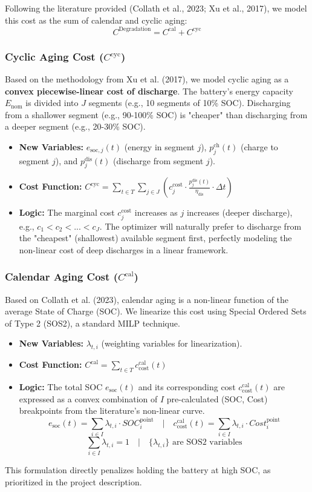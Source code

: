 \documentclass[11pt, a4paper]{article}
\begin{document}
Following the literature provided (Collath et al., 2023; Xu et al., 2017), we model this cost as the sum of calendar and cyclic aging:
$$ C^{\mathrm{Degradation}} = C^{\mathrm{cal}} + C^{\mathrm{cyc}} $$

\subsubsection{Cyclic Aging Cost ($C^{\mathrm{cyc}}$)}
Based on the methodology from Xu et al. (2017), we model cyclic aging as a \textbf{convex piecewise-linear cost of discharge}. The battery's energy capacity $E_{\mathrm{nom}}$ is divided into $J$ segments (e.g., 10 segments of 10\% SOC). Discharging from a shallower segment (e.g., 90-100\% SOC) is "cheaper" than discharging from a deeper segment (e.g., 20-30\% SOC).
\begin{itemize}
    \item \textbf{New Variables:} $e_{\mathrm{soc},j}(t)$ (energy in segment $j$), $p^{\mathrm{ch}}_{j}(t)$ (charge to segment $j$), and $p^{\mathrm{dis}}_{j}(t)$ (discharge from segment $j$).
    \item \textbf{Cost Function:} $C^{\mathrm{cyc}} = \sum_{t \in T} \sum_{j \in J} \left( c^{\mathrm{cost}}_{j} \cdot \frac{p^{\mathrm{dis}}_{j}(t)}{\eta_{\mathrm{dis}}} \cdot \Delta t \right)$
    \item \textbf{Logic:} The marginal cost $c^{\mathrm{cost}}_{j}$ increases as $j$ increases (deeper discharge), e.g., $c_1 < c_2 < ... < c_J$. The optimizer will naturally prefer to discharge from the "cheapest" (shallowest) available segment first, perfectly modeling the non-linear cost of deep discharges in a linear framework.
\end{itemize}

\subsubsection{Calendar Aging Cost ($C^{\mathrm{cal}}$)}
Based on Collath et al. (2023), calendar aging is a non-linear function of the average State of Charge (SOC). We linearize this cost using Special Ordered Sets of Type 2 (SOS2), a standard MILP technique.
\begin{itemize}
    \item \textbf{New Variables:} $\lambda_{t,i}$ (weighting variables for linearization).
    \item \textbf{Cost Function:} $C^{\mathrm{cal}} = \sum_{t \in T} c^{\mathrm{cal}}_{\mathrm{cost}}(t)$
    \item \textbf{Logic:} The total SOC $e_{\mathrm{soc}}(t)$ and its corresponding cost $c^{\mathrm{cal}}_{\mathrm{cost}}(t)$ are expressed as a convex combination of $I$ pre-calculated (SOC, Cost) breakpoints from the literature's non-linear curve.
    $$ e_{\mathrm{soc}}(t) = \sum_{i \in I} \lambda_{t,i} \cdot SOC^{\mathrm{point}}_i \quad | \quad c^{\mathrm{cal}}_{\mathrm{cost}}(t) = \sum_{i \in I} \lambda_{t,i} \cdot Cost^{\mathrm{point}}_i $$
    $$ \sum_{i \in I} \lambda_{t,i} = 1 \quad | \quad \{\lambda_{t,i}\} \text{ are SOS2 variables} $$
\end{itemize}
This formulation directly penalizes holding the battery at high SOC, as prioritized in the project description.
\end{document}
